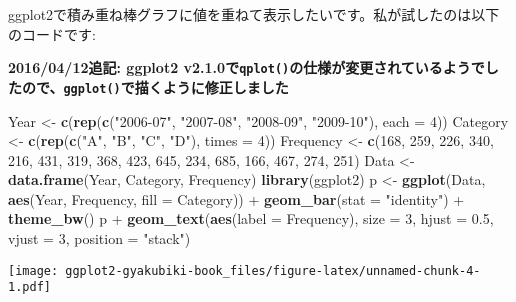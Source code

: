 \documentclass[]{book}
\newenvironment{Shaded}{\begin{snugshade}}{\end{snugshade}}
\newcommand{\KeywordTok}[1]{\textcolor[rgb]{0.13,0.29,0.53}{\textbf{{#1}}}}
\newcommand{\DataTypeTok}[1]{\textcolor[rgb]{0.13,0.29,0.53}{{#1}}}
\newcommand{\DecValTok}[1]{\textcolor[rgb]{0.00,0.00,0.81}{{#1}}}
\newcommand{\FloatTok}[1]{\textcolor[rgb]{0.00,0.00,0.81}{{#1}}}
\newcommand{\StringTok}[1]{\textcolor[rgb]{0.31,0.60,0.02}{{#1}}}
\newcommand{\NormalTok}[1]{{#1}}
\begin{document}
ggplot2で積み重ね棒グラフに値を重ねて表示したいです。私が試したのは以下のコードです:

\textbf{2016/04/12追記: ggplot2
v2.1.0で\texttt{qplot()}の仕様が変更されているようでしたので、\texttt{ggplot()}で描くように修正しました}

\begin{Shaded}
\begin{Highlighting}[]
\NormalTok{Year      <-}\StringTok{ }\KeywordTok{c}\NormalTok{(}\KeywordTok{rep}\NormalTok{(}\KeywordTok{c}\NormalTok{(}\StringTok{"2006-07"}\NormalTok{, }\StringTok{"2007-08"}\NormalTok{, }\StringTok{"2008-09"}\NormalTok{, }\StringTok{"2009-10"}\NormalTok{), }\DataTypeTok{each =} \DecValTok{4}\NormalTok{))}
\NormalTok{Category  <-}\StringTok{ }\KeywordTok{c}\NormalTok{(}\KeywordTok{rep}\NormalTok{(}\KeywordTok{c}\NormalTok{(}\StringTok{"A"}\NormalTok{, }\StringTok{"B"}\NormalTok{, }\StringTok{"C"}\NormalTok{, }\StringTok{"D"}\NormalTok{), }\DataTypeTok{times =} \DecValTok{4}\NormalTok{))}
\NormalTok{Frequency <-}\StringTok{ }\KeywordTok{c}\NormalTok{(}\DecValTok{168}\NormalTok{, }\DecValTok{259}\NormalTok{, }\DecValTok{226}\NormalTok{, }\DecValTok{340}\NormalTok{, }\DecValTok{216}\NormalTok{, }\DecValTok{431}\NormalTok{, }\DecValTok{319}\NormalTok{, }\DecValTok{368}\NormalTok{, }\DecValTok{423}\NormalTok{, }\DecValTok{645}\NormalTok{, }\DecValTok{234}\NormalTok{, }\DecValTok{685}\NormalTok{, }\DecValTok{166}\NormalTok{, }\DecValTok{467}\NormalTok{, }\DecValTok{274}\NormalTok{, }\DecValTok{251}\NormalTok{)}
\NormalTok{Data      <-}\StringTok{ }\KeywordTok{data.frame}\NormalTok{(Year, Category, Frequency)}
\KeywordTok{library}\NormalTok{(ggplot2)}
\NormalTok{p <-}\StringTok{ }\KeywordTok{ggplot}\NormalTok{(Data, }\KeywordTok{aes}\NormalTok{(Year, Frequency, }\DataTypeTok{fill =} \NormalTok{Category)) +}
\StringTok{  }\KeywordTok{geom_bar}\NormalTok{(}\DataTypeTok{stat =} \StringTok{"identity"}\NormalTok{) +}
\StringTok{  }\KeywordTok{theme_bw}\NormalTok{()}
\NormalTok{p +}\StringTok{ }\KeywordTok{geom_text}\NormalTok{(}\KeywordTok{aes}\NormalTok{(}\DataTypeTok{label =} \NormalTok{Frequency), }\DataTypeTok{size =} \DecValTok{3}\NormalTok{, }\DataTypeTok{hjust =} \FloatTok{0.5}\NormalTok{, }\DataTypeTok{vjust =} \DecValTok{3}\NormalTok{, }\DataTypeTok{position =} \StringTok{"stack"}\NormalTok{) }
\end{Highlighting}
\end{Shaded}

\texttt{[image: ggplot2-gyakubiki-book\_files/figure-latex/unnamed-chunk-4-1.pdf]}
\end{document}
